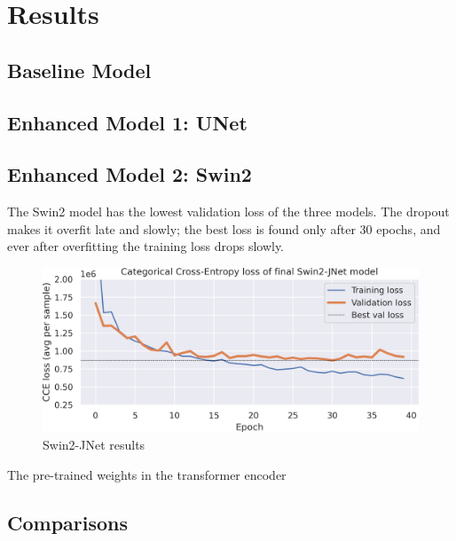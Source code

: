 \section{Results}

\subsection{Baseline Model}

\subsection{Enhanced Model 1: UNet}

\subsection{Enhanced Model 2: Swin2 }

The Swin2 model has the lowest validation loss of the three models.
The dropout makes it overfit late and slowly; the best loss is found only after 30 epochs, and ever after overfitting the training loss drops slowly.

\begin{figure}[h]
	\centering
	\includegraphics[width=.85\textwidth]{swin2_loss.png}
	\caption{Swin2-JNet results}
\end{figure}

The pre-trained weights in the transformer encoder 

\subsection{Comparisons}
